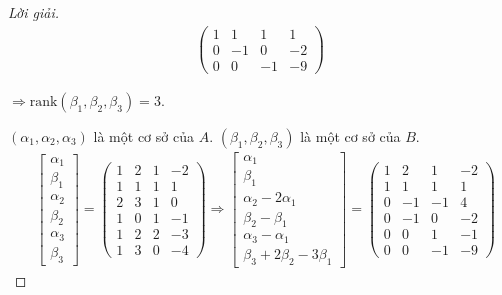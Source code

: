 \documentclass[class=linearalgebra,crop=false]{standalone}
\begin{document}
\begin{proof}[Lời giải]
\begin{align*}
\begin{pmatrix}
            1 & 1 & 1 & 1 \\
            0 & -1 & 0 & -2 \\
            0 & 0 & -1 & -9
        \end{pmatrix}
    \end{align*}
    \par $\Rightarrow\text{rank}(\beta_{1}, \beta_{2}, \beta_{3}) = 3$.
    \par $(\alpha_{1}, \alpha_{2}, \alpha_{3})$ là một cơ sở của $A$. $(\beta_{1}, \beta_{2}, \beta_{3})$ là một cơ sở của $B$.
    \begin{align*}
        &\begin{bmatrix}
            \alpha_{1} \\
            \beta_{1} \\
            \alpha_{2} \\
            \beta_{2} \\
            \alpha_{3} \\
            \beta_{3}
        \end{bmatrix}=
        \begin{pmatrix}
            1 & 2 & 1 & -2 \\
            1 & 1 & 1 & 1 \\
            2 & 3 & 1 & 0 \\
            1 & 0 & 1 & -1 \\
            1 & 2 & 2 & -3 \\
            1 & 3 & 0 & -4
        \end{pmatrix}
        \Longrightarrow
        \begin{bmatrix}
            \alpha_{1} \\
            \beta_{1} \\
            \alpha_{2} - 2\alpha_{1} \\
            \beta_{2} - \beta_{1} \\
            \alpha_{3} - \alpha_{1} \\
            \beta_{3} + 2\beta_{2} - 3\beta_{1}
        \end{bmatrix}=
        \begin{pmatrix}
            1 & 2 & 1 & -2 \\
            1 & 1 & 1 & 1 \\
            0 & -1 & -1 & 4 \\
            0 & -1 & 0 & -2 \\
            0 & 0 & 1 & -1 \\
            0 & 0 & -1 & -9

\end{pmatrix}
\end{align*}
\end{proof}
\end{document}
